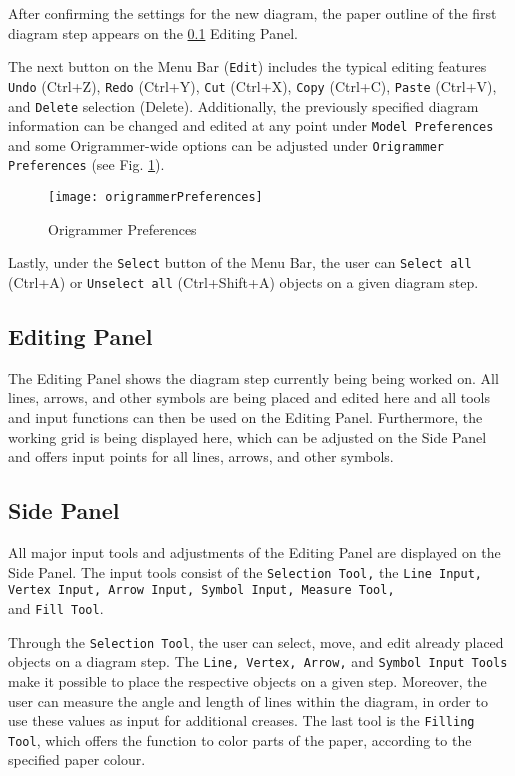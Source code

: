 After confirming the settings for the new diagram, the paper outline of the first diagram step appears on the \ref{sec:editingPanel} Editing Panel.

The next button on the Menu Bar (\texttt{Edit}) includes the typical editing features \texttt{Undo} (Ctrl+Z), \texttt{Redo} (Ctrl+Y), \texttt{Cut} (Ctrl+X), \texttt{Copy} (Ctrl+C), \texttt{Paste} (Ctrl+V), and \texttt{Delete} selection (Delete). Additionally, the previously specified diagram information can be changed and edited at any point under \texttt{Model Preferences} and some Origrammer-wide options can be adjusted under \texttt{Origrammer Preferences} (see Fig. \ref{fig:origrammerPreferences}).

\begin{figure}[h]
	\centering
	\texttt{[image: origrammerPreferences]}
	\caption{Origrammer Preferences}
	\label{fig:origrammerPreferences}
\end{figure}

\noindent Lastly, under the \texttt{Select} button of the Menu Bar, the user can \texttt{Select all} (Ctrl+A) or \texttt{Unselect all} (Ctrl+Shift+A) objects on a given diagram step.

\subsection{Editing Panel}
\label{sec:editingPanel}

The Editing Panel shows the diagram step currently being being worked on. All lines, arrows, and other symbols are being placed and edited here and all tools and input functions can then be used on the Editing Panel. Furthermore, the working grid is being displayed here, which can be adjusted on the Side Panel and offers input points for all lines, arrows, and other symbols.

\subsection{Side Panel}
\label{sec:sidePanel}

All major input tools and adjustments of the Editing Panel are displayed on the Side Panel. The input tools consist of the \texttt{Selection Tool,} the \texttt{Line Input, Vertex Input, Arrow Input, Symbol Input, Measure Tool,}\\ and \texttt{Fill Tool}.

Through the \texttt{Selection Tool}, the user can select, move, and edit already placed objects on a diagram step. The \texttt{Line, Vertex, Arrow,} and \texttt{Symbol Input Tools} make it possible to place the respective objects on a given step. Moreover, the user can measure the angle and length of lines within the diagram, in order to use these values as input for additional creases. The last tool is the \texttt{Filling Tool}, which offers the function to color parts of the paper, according to the specified paper colour.

